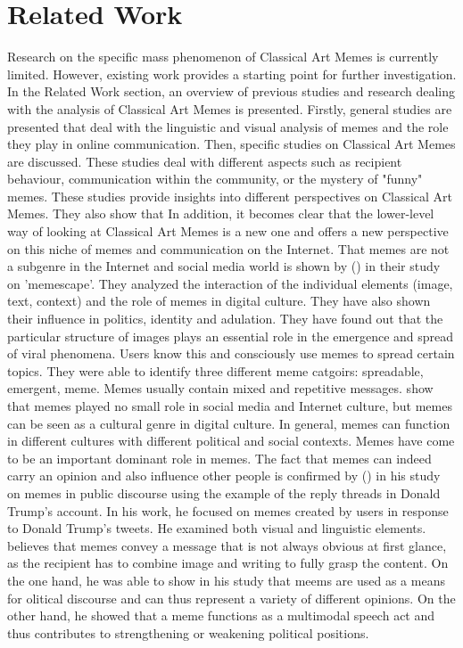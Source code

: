 \documentclass[11pt,a4paper]{article}
\begin{document}
\section{Related Work}
Research on the specific mass phenomenon of Classical Art Memes is currently limited. However, existing work provides a starting point for further investigation. In the Related Work section, an overview of previous studies and research dealing with the analysis of Classical Art Memes is presented. Firstly, general studies are presented that deal with the linguistic and visual analysis of memes and the role they play in online communication. Then, specific studies on Classical Art Memes are discussed. These studies deal with different aspects such as recipient behaviour, communication within the community, or the mystery of "funny" memes. These studies provide insights into different perspectives on Classical Art Memes. They also show that In addition, it becomes clear that the lower-level way of looking at Classical Art Memes is a new one and offers a new perspective on this niche of memes and communication on the Internet.
That memes are not a subgenre in the Internet and social media world is shown by \citeauthor{wiggins2015} (\citeyear{wiggins2015}) in their study on 'memescape'. They analyzed the interaction of the individual elements (image, text, context) and the role of memes in digital culture. They have also shown their influence in politics, identity and adulation. They have found out that the particular structure of images plays an essential role in the emergence and spread of viral phenomena. Users know this and consciously use memes to spread certain topics. They were able to identify three different meme catgoirs: spreadable, emergent, meme. Memes usually contain mixed and repetitive messages. \citeauthor{wiggins2015} show that memes played no small role in social media and Internet culture, but memes can be seen as a cultural genre in digital culture.  In general, memes can function in different cultures with different political and social contexts. Memes have come to be an important dominant role in memes. The fact that memes can indeed carry an opinion and also influence other people is confirmed by \citeauthor{Osterroth2019} (\citeyear{Osterroth2019}) in his study on memes in public discourse using the example of the reply threads in Donald Trump's account. In his work, he focused on memes created by users in response to Donald Trump's tweets. He examined both visual and linguistic elements. \citeauthor{Osterroth2019} believes that memes convey a message that is not always obvious at first glance, as the recipient has to combine image and writing to fully grasp the content. On the one hand, he was able to show in his study that meems are used as a means for olitical discourse and can thus represent a variety of different opinions. On the other hand, he showed that a meme functions as a multimodal speech act and thus contributes to strengthening or weakening political positions.
\end{document}

